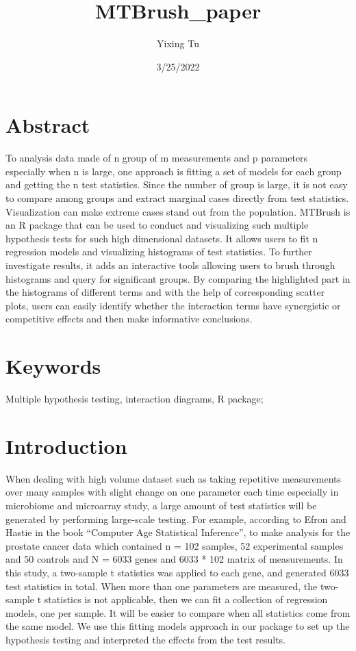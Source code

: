 \documentclass[
]{article}
\title{MTBrush\_paper}
\author{Yixing Tu}
\date{3/25/2022}
\begin{document}
\maketitle

\hypertarget{abstract}{%
\section{Abstract}\label{abstract}}

To analysis data made of n group of m measurements and p parameters
especially when n is large, one approach is fitting a set of models for
each group and getting the n test statistics. Since the number of group
is large, it is not easy to compare among groups and extract marginal
cases directly from test statistics. Visualization can make extreme
cases stand out from the population. MTBrush is an R package that can be
used to conduct and visualizing such multiple hypothesis tests for such
high dimensional datasets. It allows users to fit n regression models
and visualizing histograms of test statistics. To further investigate
results, it adds an interactive tools allowing users to brush through
histograms and query for significant groups. By comparing the
highlighted part in the histograms of different terms and with the help
of corresponding scatter plots, users can easily identify whether the
interaction terms have synergistic or competitive effects and then make
informative conclusions.

\hypertarget{keywords}{%
\section{Keywords}\label{keywords}}

Multiple hypothesis testing, interaction diagrams, R package;

\hypertarget{introduction}{%
\section{Introduction}\label{introduction}}

When dealing with high volume dataset such as taking repetitive
measurements over many samples with slight change on one parameter each
time especially in microbiome and microarray study, a large amount of
test statistics will be generated by performing large-scale testing. For
example, according to Efron and Hastie in the book ``Computer Age
Statistical Inference'', to make analysis for the prostate cancer data
which contained n = 102 samples, 52 experimental samples and 50 controls
and N = 6033 genes and 6033 * 102 matrix of measurements. In this study,
a two-sample t statistics was applied to each gene, and generated 6033
test statistics in total. When more than one parameters are measured,
the two-sample t statistics is not applicable, then we can fit a
collection of regression models, one per sample. It will be easier to
compare when all statistics come from the same model. We use this
fitting models approach in our package to set up the hypothesis testing
and interpreted the effects from the test results.
\end{document}
